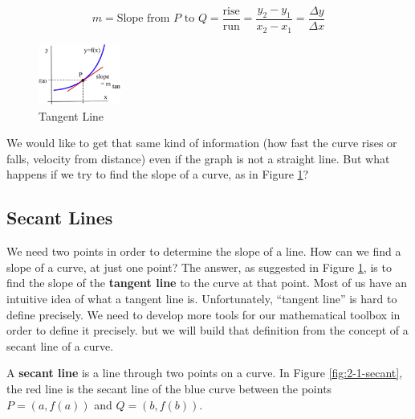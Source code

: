 $$m = \mbox{Slope from } P \mbox{ to } Q = \frac{\mbox{rise}}{\mbox{run}} = \frac{y_2-y_1}{x_2-x_1} = \frac{\Delta y}{\Delta x}$$


\begin{figure}
  \vspace{-10pt}
  \centering
    \includegraphics[width=0.24\textwidth]{img/chap2/image002.png}
\caption{Tangent Line}
\label{fig:2-1-slopeCurve}
\vspace{-10pt}
\end{figure}

We would like to get that same kind of information (how fast the curve rises or falls, velocity from distance) even if the graph is not a straight line. But what happens if we try to find the slope of a curve, as in Figure \ref{fig:2-1-slopeCurve}?

\subsection{Secant Lines}



We need two points in order to determine the slope of a line. How can we find a slope of a curve, at just one point? The answer, as suggested in Figure \ref{fig:2-1-slopeCurve}, is to find the slope of the {\bf tangent line} to the curve at that point. Most of us have an intuitive idea of what a tangent line is. Unfortunately, ``tangent line'' is hard to define precisely. We need to develop more tools for our mathematical toolbox in order to define it precisely. but we will build that definition from the concept of a secant line of a curve.

\begin{definition}
A {\bf secant line} is a line through two points on a curve. In Figure \ref{fig:2-1-secant}, the red line is the secant line of the blue curve between the points $P = (a, f(a))$ and $Q = (b, f(b))$.
\end{definition}

